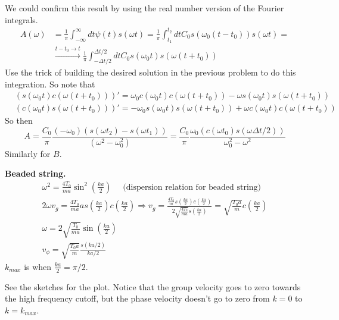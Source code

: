 \documentclass[twoside,10pt]{amsart}
\newcommand{\problemhead}[1]
  {\smallskip
   \noindent{\large\bf Problem #1.}
   \smallskip}
\begin{document}
We could confirm this result by using the real number version of the Fourier integrals. 
\[
\begin{aligned}
  A(\omega) & = \frac{1}{ \pi }\int_{-\infty}^{\infty} dt \psi(t) s(\omega t) = \frac{1}{ \pi} \int_{t_1}^{t_2} dt C_0 s(\omega_0(t-t_0) ) s(\omega t) = \\
  & \xrightarrow{ t-t_0 \to t } \frac{1}{\pi} \int_{-\Delta t/2}^{\Delta t/2 } dt C_0 s(\omega_0 t ) s(\omega (t +t_0) ) 
\end{aligned}
\]
Use the trick of building the desired solution in the previous problem to do this integration.  So note that \\
$\begin{aligned}
 & (s(\omega_0 t) c(\omega (t+t_0)))' = \omega_0 c(\omega_0 t ) c(\omega( t+t_0) ) - \omega s(\omega_0 t) s(\omega (t+t_0)) \\
 & (c(\omega_0 t) s(\omega (t+t_0)))' = -\omega_0 s(\omega_0 t ) s(\omega( t+t_0) ) + \omega c(\omega_0 t) c(\omega (t+t_0)) 
\end{aligned}$
So then
\[
A = \frac{C_0}{\pi} \frac{ (-\omega_0) ( s(\omega t_2) - s(\omega t_1 ) ) }{ (\omega^2 - \omega_0^2 ) } = \frac{C_0}{\pi} \frac{ \omega_0 (c(\omega t_0) s(\omega \Delta t/2) ) }{ \omega_0^2 - \omega^2 } 
\]
Similarly for $B$.  

\problemhead{6.17} \textbf{ Beaded string.}
\[
\begin{gathered}
  \omega^2 = \frac{4T_0}{ma} \sin^2{\left( \frac{ka}{2} \right) } \quad \text{ (dispersion relation for beaded string) } \\
  2 \omega v_g = \frac{4 T_0 }{ma} a s\left( \frac{ka}{2} \right) c\left( \frac{ka}{2} \right) \Longrightarrow v_g = \frac{ \frac{4T_0}{m} s\left( \frac{ka}{2} \right) c\left( \frac{ka}{2} \right) }{ 2 \sqrt{ \frac{4T_0}{ma} } s\left( \frac{ka}{2} \right) } = \sqrt{\frac{ T_0 a }{m} } c\left( \frac{ka}{2} \right) \\
  \omega = 2 \sqrt{ \frac{T_0}{ma} } \sin{ \left( \frac{ka}{2}\right) } \\
  v_{\phi} = \sqrt{ \frac{T_0 a}{m}} \frac{s(ka/2) }{ ka/2} 
\end{gathered}
\]
$k_{max}$ is when $\frac{ka}{2} = \pi/2$.  

See the sketches for the plot.  Notice that the group velocity goes to zero towards the high frequency cutoff, but the phase velocity doesn't go to zero from $k=0$ to $k=k_{max}$.  
  
\end{document}

